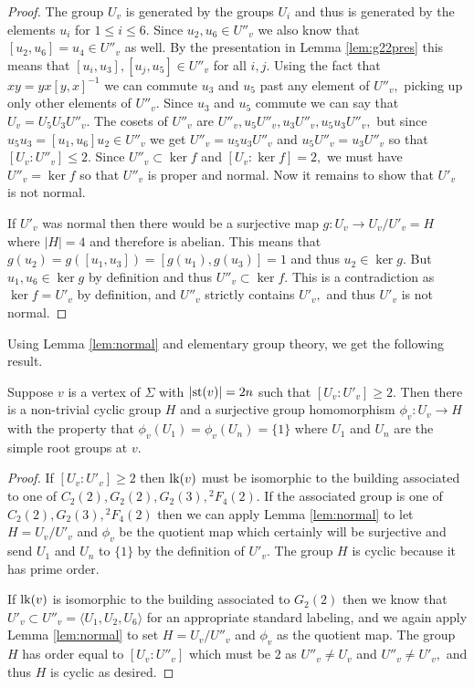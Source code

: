\documentclass[class=book, crop=false,12 pt]{standalone}
\begin{document}
\begin{proof}
	The group $U_v$ is generated by the groups $U_i$ and thus is generated by the elements $u_i$ for $1\le i \le 6.$ Since $u_2,u_6\in U''_v$ we also know that $[u_2,u_6]=u_4\in U''_v$ as well. By the presentation in Lemma \ref{lem:g22pres} this means that $[u_i,u_3],[u_j,u_5]\in U''_v$ for all $i,j.$ Using the fact that $xy=yx[y,x]^{-1}$ we can commute $u_3$ and $u_5$ past any element of $U''_v,$ picking up only other elements of $U''_v.$ Since $u_3$ and $u_5$ commute we can say that $U_v=U_5U_3U''_v.$ The cosets of $U''_v$ are $U''_v,u_5U''_v,u_3U''_v,u_5u_3U''_v,$ but since $u_5u_3=[u_1,u_6]u_2\in U''_v$ we get $U''_v=u_5u_3U''_v$ and $u_5U''_v=u_3U''_v$ so that $[U_v:U''_v]\le 2.$ Since $U''_v\subset \ker f$ and $[U_v:\ker f]=2,$ we must have $U''_v=\ker f$ so that $U''_v$ is proper and normal. Now it remains to show that $U'_v$ is not normal.

	If $U'_v$ was normal then there would be a surjective map $g:U_v\to U_v/U'_v=H$ where $|H|=4$ and therefore is abelian. This means that $g(u_2)=g([u_1,u_3])=[g(u_1),g(u_3)]=1$ and thus $u_2\in \ker g.$ But $u_1,u_6\in \ker g$ by definition and thus $U''_v\subset \ker f.$ This is a contradiction as $\ker f=U'_v$ by definition, and $U''_v$ strictly contains $U'_v,$ and thus $U'_v$ is not normal.

\end{proof}

Using Lemma \ref{lem:normal} and elementary group theory, we get the following result.
\begin{cor}
	\label{cor:phiv}
	Suppose $v$ is a vertex of $\Sigma$ with $|\mathrm{st}(v)|=2n$ such that $[U_v:U'_v]\ge 2.$ Then there is a non-trivial cyclic group $H$ and a surjective group homomorphism $\phi_v:U_v\to H$ with the property that $\phi_v(U_1)=\phi_v(U_n)=\{1\}$ where $U_1$ and $U_n$ are the simple root groups at $v.$
\end{cor}
\begin{proof}
	If $[U_v:U'_v]\ge 2$ then $\mathrm{lk}(v)$ must be isomorphic to the building associated to one of $C_2(2),G_2(2),G_2(3),{}^2F_4(2).$ If the associated group is one of $C_2(2),G_2(3),{}^2F_4(2)$ then we can apply Lemma \ref{lem:normal} to let $H=U_v/U'_v$ and $\phi_v$ be the quotient map which certainly will be surjective and send $U_1$ and $U_n$ to $\{1\}$ by the definition of $U'_v.$ The group $H$ is cyclic because it has prime order.

	If $\mathrm{lk}(v)$ is isomorphic to the building associated to $G_2(2)$ then we know that $U'_v\subset U''_v=\langle U_1,U_2,U_6\rangle$ for an appropriate standard labeling, and we again apply Lemma \ref{lem:normal} to set $H=U_v/U''_v$ and $\phi_v$ as the quotient map. The group $H$ has order equal to $[U_v:U''_v]$ which must be $2$ as $U''_v\neq U_v$ and $U''_v\neq U'_v,$ and thus $H$ is cyclic as desired.
\end{proof}
\end{document}
